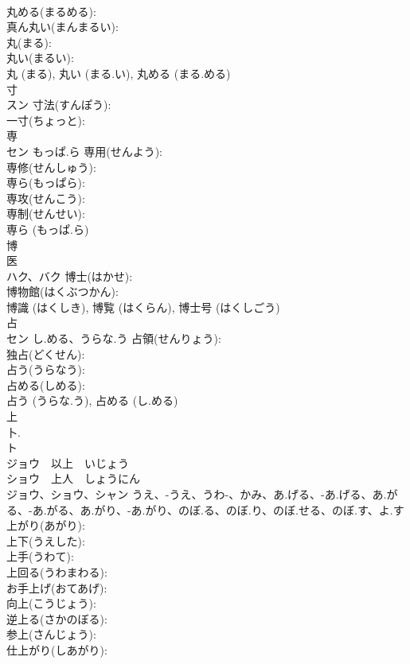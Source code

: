 \documentclass[8pt]{extreport}
\begin{document}
\begin{CJK}{UTF8}{min}
\\	丸める(まるめる): 
\\	真ん丸い(まんまるい): 
\\	丸(まる): 
\\	丸い(まるい): 
\\	丸 (まる), 丸い (まる.い), 丸める (まる.める)
\\	寸			
\\	スン		寸法(すんぽう): 
\\	一寸(ちょっと): 
\\	専			
\\	セン	もっぱ.ら	専用(せんよう): 
\\	専修(せんしゅう): 
\\	専ら(もっぱら): 
\\	専攻(せんこう): 
\\	専制(せんせい): 
\\	専ら (もっぱ.ら)
\\	博			
\\	医 
\\	ハク、バク		博士(はかせ): 
\\	博物館(はくぶつかん): 
\\	博識 (はくしき), 博覧 (はくらん), 博士号 (はくしごう)
\\	占			
\\	セン	し.める、うらな.う	占領(せんりょう): 
\\	独占(どくせん): 
\\	占う(うらなう): 
\\	占める(しめる): 
\\	占う (うらな.う), 占める (し.める)
\\	上			
\\	卜. 
\\	ト
\\	ジョウ　以上　いじょう
\\	ショウ　上人　しょうにん
\\	ジョウ、ショウ、シャン	うえ、-うえ、うわ-、かみ、あ.げる、-あ.げる、あ.がる、-あ.がる、あ.がり、-あ.がり、のぼ.る、のぼ.り、のぼ.せる、のぼ.す、よ.す	上がり(あがり): 
\\	上下(うえした): 
\\	上手(うわて): 
\\	上回る(うわまわる): 
\\	お手上げ(おてあげ): 
\\	向上(こうじょう): 
\\	逆上る(さかのぼる): 
\\	参上(さんじょう): 
\\	仕上がり(しあがり): 

\end{CJK}
\end{document}
